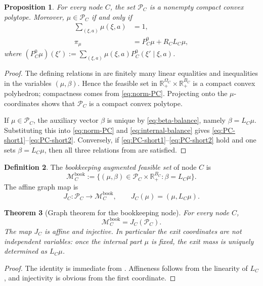 \documentclass[12pt]{article}
\newtheorem{theorem}{Theorem}[section]
\newtheorem{proposition}[theorem]{Proposition}
\theoremstyle{definition}
\newtheorem{definition}[theorem]{Definition}
\newcommand{\R}{\mathbb{R}}
\newcommand{\1}{\mathbf{1}}
\newcommand{\cM}{\mathcal{M}}
\newcommand{\cP}{\mathcal{P}}
\begin{document}
\begin{proposition}
\label{prop:PC-polytope}
For every node $C$, the set $\cP_C$ is a nonempty compact convex polytope.
Moreover, $\mu\in\cP_C$ if and only if
\begin{align}
\sum_{(\xi,a)}\mu(\xi,a)&=1,
\label{eq:PC-short1}
\\
\pi_\mu &= P_C^0\mu + R_C L_C\mu,
\label{eq:PC-short2}
\end{align}
where $(P_C^0\mu)(\xi'):=\sum_{(\xi,a)}\mu(\xi,a)P_C^0(\xi'\mid\xi,a)$.
\end{proposition}

\begin{proof}
The defining relations in  are finitely many linear equalities and
inequalities in the variables $(\mu,\beta)$. Hence the feasible set in
$\R_+^{\Omega_C}\times\R_+^{B_C}$ is a compact convex polyhedron; compactness
comes from \eqref{eq:norm-PC}. Projecting onto the $\mu$-coordinates shows that
$\cP_C$ is a compact convex polytope.

If $\mu\in\cP_C$, the auxiliary vector $\beta$ is unique by
\eqref{eq:beta-balance}, namely $\beta=L_C\mu$. Substituting this into
\eqref{eq:norm-PC} and \eqref{eq:internal-balance} gives
\eqref{eq:PC-short1}--\eqref{eq:PC-short2}. Conversely, if
\eqref{eq:PC-short1}--\eqref{eq:PC-short2} hold and one sets $\beta=L_C\mu$, then
all three relations from  are satisfied.
\end{proof}


\begin{definition}
\label{def:MCbook}
The \emph{bookkeeping augmented feasible set} of node $C$ is
\[
\cM_C^{\mathrm{book}}
:=
\{(\mu,\beta)\in\cP_C\times\R_+^{B_C}:\beta=L_C\mu\}.
\]
The affine graph map is
\[
J_C:\cP_C\to \cM_C^{\mathrm{book}},
\qquad J_C(\mu)=(\mu,L_C\mu).
\]
\end{definition}

\begin{theorem}[Graph theorem for the bookkeeping node]
\label{thm:graph-theorem}
For every node $C$,
\[
\cM_C^{\mathrm{book}} = J_C(\cP_C).
\]
The map $J_C$ is affine and injective. In particular the exit coordinates are not
independent variables: once the internal part $\mu$ is fixed, the exit mass is
uniquely determined as $L_C\mu$.
\end{theorem}

\begin{proof}
The identity is immediate from . Affineness follows from the
linearity of $L_C$, and injectivity is obvious from the first coordinate.
\end{proof}
\end{document}
